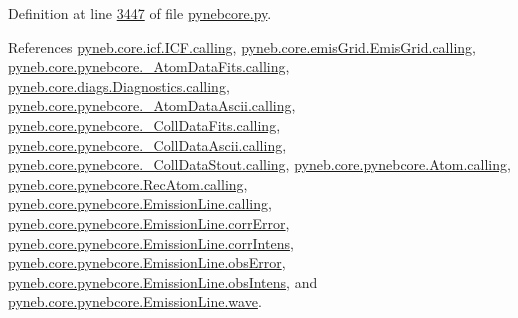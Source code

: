 Definition at line \hyperlink{pynebcore_8py_source_l03447}{3447} of file \hyperlink{pynebcore_8py_source}{pynebcore.\-py}.



References \hyperlink{icf_8py_source_l00016}{pyneb.\-core.\-icf.\-I\-C\-F.\-calling}, \hyperlink{emis_grid_8py_source_l00044}{pyneb.\-core.\-emis\-Grid.\-Emis\-Grid.\-calling}, \hyperlink{pynebcore_8py_source_l00097}{pyneb.\-core.\-pynebcore.\-\_\-\-Atom\-Data\-Fits.\-calling}, \hyperlink{diags_8py_source_l00169}{pyneb.\-core.\-diags.\-Diagnostics.\-calling}, \hyperlink{pynebcore_8py_source_l00318}{pyneb.\-core.\-pynebcore.\-\_\-\-Atom\-Data\-Ascii.\-calling}, \hyperlink{pynebcore_8py_source_l00585}{pyneb.\-core.\-pynebcore.\-\_\-\-Coll\-Data\-Fits.\-calling}, \hyperlink{pynebcore_8py_source_l00936}{pyneb.\-core.\-pynebcore.\-\_\-\-Coll\-Data\-Ascii.\-calling}, \hyperlink{pynebcore_8py_source_l01156}{pyneb.\-core.\-pynebcore.\-\_\-\-Coll\-Data\-Stout.\-calling}, \hyperlink{pynebcore_8py_source_l01229}{pyneb.\-core.\-pynebcore.\-Atom.\-calling}, \hyperlink{pynebcore_8py_source_l02643}{pyneb.\-core.\-pynebcore.\-Rec\-Atom.\-calling}, \hyperlink{pynebcore_8py_source_l03385}{pyneb.\-core.\-pynebcore.\-Emission\-Line.\-calling}, \hyperlink{pynebcore_8py_source_l03439}{pyneb.\-core.\-pynebcore.\-Emission\-Line.\-corr\-Error}, \hyperlink{pynebcore_8py_source_l03423}{pyneb.\-core.\-pynebcore.\-Emission\-Line.\-corr\-Intens}, \hyperlink{pynebcore_8py_source_l03434}{pyneb.\-core.\-pynebcore.\-Emission\-Line.\-obs\-Error}, \hyperlink{pynebcore_8py_source_l03421}{pyneb.\-core.\-pynebcore.\-Emission\-Line.\-obs\-Intens}, and \hyperlink{pynebcore_8py_source_l03392}{pyneb.\-core.\-pynebcore.\-Emission\-Line.\-wave}.


